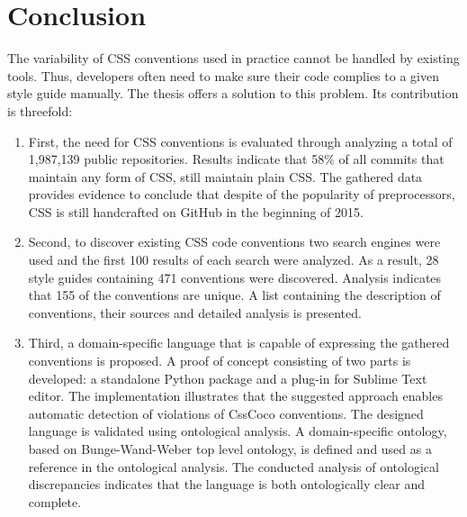 \chapter{Conclusion}
\label{sec:conclusion}

The variability of CSS conventions used in practice cannot be handled by
existing tools. Thus, developers often need to make sure their code complies
to a given style guide manually. The thesis offers a solution to this problem.
Its contribution is threefold:

\begin{enumerate}
	\item First, the need for CSS conventions is evaluated through analyzing a total of 1,987,139 public repositories. Results indicate that 58\% of all commits that maintain any form of CSS, still maintain plain CSS. The gathered data provides evidence to conclude that despite of the popularity of preprocessors, CSS is still handcrafted on GitHub in the beginning of 2015.
	\item Second, to discover existing CSS code conventions two search engines were used and the first 100 results of each search were analyzed. As a result, 28 style guides containing 471 conventions were discovered. Analysis indicates that 155 of the conventions are unique. A list containing the description of conventions, their sources and detailed analysis is presented. 
	\item Third, a domain-specific language that is capable of expressing the gathered conventions is proposed. A proof of concept consisting of two parts is developed: a standalone Python package and a plug-in for Sublime Text editor. The implementation illustrates that the suggested approach enables automatic detection of violations of CssCoco conventions. The designed language is validated using ontological analysis. A domain-specific ontology, based on Bunge-Wand-Weber top level ontology, is defined and used as a reference in the ontological analysis. The conducted analysis of ontological discrepancies indicates that the language is both ontologically clear and complete.
\end{enumerate}

